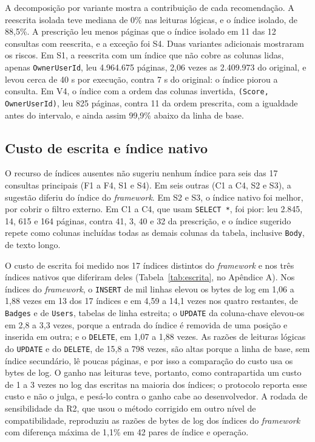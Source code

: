 A decomposição por variante mostra a contribuição de cada recomendação. A reescrita isolada teve mediana de 0\% nas leituras lógicas, e o índice isolado, de 88,5\%. A prescrição leu menos páginas que o índice isolado em 11 das 12 consultas com reescrita, e a exceção foi S4. Duas variantes adicionais mostraram os riscos. Em S1, a reescrita com um índice que não cobre as colunas lidas, apenas \texttt{OwnerUserId}, leu 4.964.675 páginas, 2,06 vezes as 2.409.973 do original, e levou cerca de 40 s por execução, contra 7 s do original: o índice piorou a consulta. Em V4, o índice com a ordem das colunas invertida, \texttt{(Score, OwnerUserId)}, leu 825 páginas, contra 11 da ordem prescrita, com a igualdade antes do intervalo, e ainda assim 99,9\% abaixo da linha de base.

\subsection{Custo de escrita e índice nativo}\label{sec:escrita}

O recurso de índices ausentes não sugeriu nenhum índice para seis das 17 consultas principais (F1 a F4, S1 e S4). Em seis outras (C1 a C4, S2 e S3), a sugestão diferiu do índice do \textit{framework}. Em S2 e S3, o índice nativo foi melhor, por cobrir o filtro externo. Em C1 a C4, que usam \texttt{SELECT *}, foi pior: leu 2.845, 14, 615 e 164 páginas, contra 41, 3, 40 e 32 da prescrição, e o índice sugerido repete como colunas incluídas todas as demais colunas da tabela, inclusive \texttt{Body}, de texto longo.

O custo de escrita foi medido nos 17 índices distintos do \textit{framework} e nos três índices nativos que diferiram deles (Tabela~\ref{tab:escrita}, no Apêndice A). Nos índices do \textit{framework}, o \texttt{INSERT} de mil linhas elevou os bytes de log em 1,06 a 1,88 vezes em 13 dos 17 índices e em 4,59 a 14,1 vezes nos quatro restantes, de \texttt{Badges} e de \texttt{Users}, tabelas de linha estreita; o \texttt{UPDATE} da coluna-chave elevou-os em 2,8 a 3,3 vezes, porque a entrada do índice é removida de uma posição e inserida em outra; e o \texttt{DELETE}, em 1,07 a 1,88 vezes. As razões de leituras lógicas do \texttt{UPDATE} e do \texttt{DELETE}, de 15,8 a 798 vezes, são altas porque a linha de base, sem índice secundário, lê poucas páginas, e por isso a comparação do custo usa os bytes de log. O ganho nas leituras teve, portanto, como contrapartida um custo de 1 a 3 vezes no log das escritas na maioria dos índices; o protocolo reporta esse custo e não o julga, e pesá-lo contra o ganho cabe ao desenvolvedor. A rodada de sensibilidade da R2, que usou o método corrigido em outro nível de compatibilidade, reproduziu as razões de bytes de log dos índices do \textit{framework} com diferença máxima de 1,1\% em 42 pares de índice e operação.

